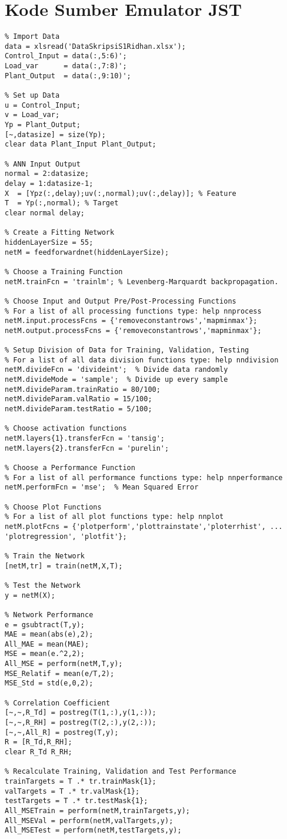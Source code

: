 \section{Kode Sumber Emulator JST}
\begin{lstlisting}
% Import Data
data = xlsread('DataSkripsiS1Ridhan.xlsx');
Control_Input = data(:,5:6)';
Load_var      = data(:,7:8)';
Plant_Output  = data(:,9:10)';

% Set up Data
u = Control_Input;
v = Load_var;
Yp = Plant_Output;
[~,datasize] = size(Yp);
clear data Plant_Input Plant_Output;

% ANN Input Output
normal = 2:datasize;
delay = 1:datasize-1;
X  = [Ypz(:,delay);uv(:,normal);uv(:,delay)]; % Feature
T  = Yp(:,normal); % Target
clear normal delay;

% Create a Fitting Network
hiddenLayerSize = 55;
netM = feedforwardnet(hiddenLayerSize);

% Choose a Training Function
netM.trainFcn = 'trainlm'; % Levenberg-Marquardt backpropagation.

% Choose Input and Output Pre/Post-Processing Functions
% For a list of all processing functions type: help nnprocess
netM.input.processFcns = {'removeconstantrows','mapminmax'};
netM.output.processFcns = {'removeconstantrows','mapminmax'};

% Setup Division of Data for Training, Validation, Testing
% For a list of all data division functions type: help nndivision
netM.divideFcn = 'divideint';  % Divide data randomly
netM.divideMode = 'sample';  % Divide up every sample
netM.divideParam.trainRatio = 80/100;
netM.divideParam.valRatio = 15/100;
netM.divideParam.testRatio = 5/100;

% Choose activation functions
netM.layers{1}.transferFcn = 'tansig';
netM.layers{2}.transferFcn = 'purelin';

% Choose a Performance Function
% For a list of all performance functions type: help nnperformance
netM.performFcn = 'mse';  % Mean Squared Error

% Choose Plot Functions
% For a list of all plot functions type: help nnplot
netM.plotFcns = {'plotperform','plottrainstate','ploterrhist', ...
'plotregression', 'plotfit'};

% Train the Network
[netM,tr] = train(netM,X,T);

% Test the Network
y = netM(X);

% Network Performance
e = gsubtract(T,y);
MAE = mean(abs(e),2);
All_MAE = mean(MAE);
MSE = mean(e.^2,2);
All_MSE = perform(netM,T,y);
MSE_Relatif = mean(e/T,2);
MSE_Std = std(e,0,2);

% Correlation Coefficient
[~,~,R_Td] = postreg(T(1,:),y(1,:));
[~,~,R_RH] = postreg(T(2,:),y(2,:));
[~,~,All_R] = postreg(T,y);
R = [R_Td,R_RH];
clear R_Td R_RH;

% Recalculate Training, Validation and Test Performance
trainTargets = T .* tr.trainMask{1};
valTargets = T .* tr.valMask{1};
testTargets = T .* tr.testMask{1};
All_MSETrain = perform(netM,trainTargets,y);
All_MSEVal = perform(netM,valTargets,y);
All_MSETest = perform(netM,testTargets,y);

\end{lstlisting}
\hfill

